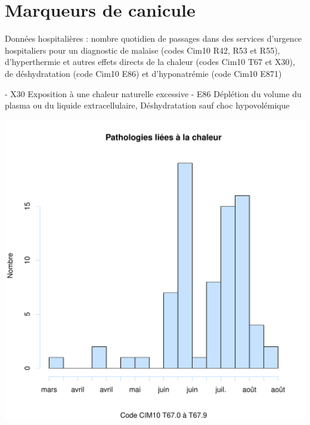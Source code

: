 \documentclass[12pt,english,french,twoside]{report}\usepackage[]{graphicx}\usepackage[]{color}
\makeatletter
\def\maxwidth{ %
  \ifdim\Gin@nat@width>\linewidth
    \linewidth
  \else
    \Gin@nat@width
  \fi
}
\newenvironment{knitrout}{}{} %
\makeatother
\begin{document}
\section{Marqueurs de canicule}

Données hospitalières : nombre quotidien de passages dans des services d'urgence hospitaliers pour un diagnostic de malaise (codes Cim10 R42, R53 et R55), d'hyperthermie et autres effets directs de la chaleur (codes Cim10 T67 et X30), de déshydratation (code Cim10 E86) et d'hyponatrémie (code Cim10 E871)

- X30  Exposition à une chaleur naturelle excessive
- E86  Déplétion du volume du plasma ou du liquide extracellulaire, Déshydratation sauf choc hypovolémique

\begin{knitrout}
\color{fgcolor}
\includegraphics[width=\maxwidth]{figure/canicule1} 


\end{knitrout}
\end{document}
